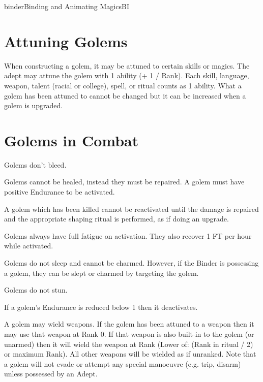 \begin{College}[1.2]{binder}{Binding and Animating Magics}{BI}
\section{Attuning Golems}

When constructing a golem, it may be attuned to certain skills or
magics.  The adept may attune the golem with 1 ability (+ 1 / Rank).
Each skill, language, weapon, talent (racial or college), spell, or
ritual counts as 1 ability.  What a golem has been attuned to cannot
be changed but it can be increased when a golem is upgraded.


\section{Golems in Combat}

\begin{Description}

\item[Bleeding] Golems don’t bleed. 

\item[Damaged Golems] Golems cannot be healed, instead they must be
  repaired.  A golem must have positive Endurance to be activated.

\item[Dead Golems] A golem which has been killed cannot be reactivated
  until the damage is repaired and the appropriate shaping ritual is
  performed, as if doing an upgrade.

\item[Fatigue Recovery] Golems always have full fatigue on activation.
  They also recover 1 FT per hour while activated.

\item[Sleep and Charm] Golems do not sleep and cannot be charmed.
  However, if the Binder is possessing a golem, they can be slept or
  charmed by targeting the golem.

\item[Stun] Golems do not stun.

\item[Unconsciousness] If a golem’s Endurance is reduced below 1 then
  it deactivates.

\item[Weapon Ranks] A golem may wield weapons.  If the golem has been
  attuned to a weapon then it may use that weapon at Rank 0.  If that
  weapon is also built-in to the golem (or unarmed) then it will wield
  the weapon at Rank (Lower of: (Rank in ritual / 2) or maximum Rank).
  All other weapons will be wielded as if unranked.  Note that a golem
  will not evade or attempt any special manoeuvre (e.g. trip, disarm)
  unless possessed by an Adept.


\end{Description}
\end{College}
